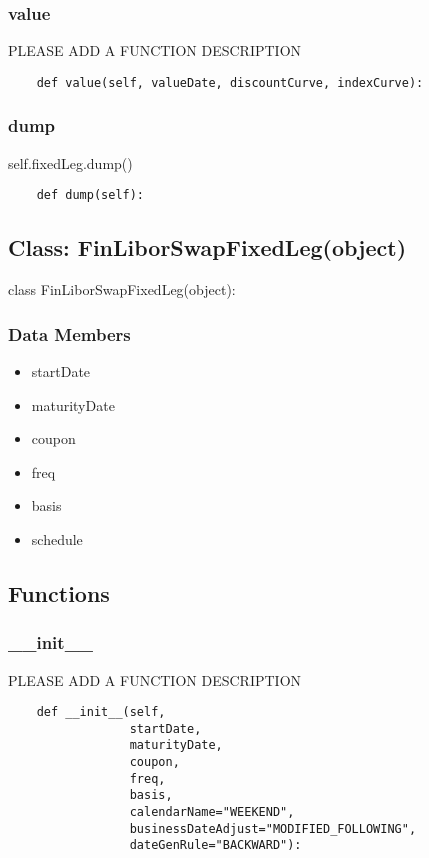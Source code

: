 \documentclass[twoside,11pt]{book}
\begin{document}
\subsubsection*{{\bf value}}
PLEASE ADD A FUNCTION DESCRIPTION

\begin{lstlisting}
    def value(self, valueDate, discountCurve, indexCurve):
\end{lstlisting}

\subsubsection*{{\bf dump}}
self.fixedLeg.dump() 

\begin{lstlisting}
    def dump(self):
\end{lstlisting}

\subsection*{Class: FinLiborSwapFixedLeg(object)}
class FinLiborSwapFixedLeg(object): 

\subsubsection*{Data Members}
\begin{itemize}
\item{startDate}
\item{maturityDate}
\item{coupon}
\item{freq}
\item{basis}
\item{schedule}
\end{itemize}

\subsection*{Functions}

\subsubsection*{{\bf \_\_init\_\_}}
PLEASE ADD A FUNCTION DESCRIPTION

\begin{lstlisting}
    def __init__(self,
                 startDate,
                 maturityDate,
                 coupon,
                 freq,
                 basis,
                 calendarName="WEEKEND",
                 businessDateAdjust="MODIFIED_FOLLOWING",
                 dateGenRule="BACKWARD"):
\end{lstlisting}
\end{document}
